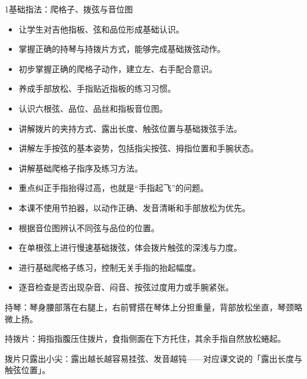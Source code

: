 \begin{lessoncard}{1}{基础指法：爬格子、拨弦与音位图}
\begin{itemize}
\item 让学生对吉他指板、弦和品位形成基础认识。
\item 掌握正确的持琴与持拨片方式，能够完成基础拨弦动作。
\item 初步掌握正确的爬格子动作，建立左、右手配合意识。
\item 养成手部放松、手指贴近指板的练习习惯。
\end{itemize}
\begin{itemize}
\item 认识六根弦、品位、品丝和指板音位图。
\item 讲解拨片的夹持方式、露出长度、触弦位置与基础拨弦手法。
\item 讲解左手按弦的基本姿势，包括指尖按弦、拇指位置和手腕状态。
\item 讲解基础爬格子指序及练习方法。
\item 重点纠正手指抬得过高，也就是“手指起飞”的问题。
\item 本课不使用节拍器，以动作正确、发音清晰和手部放松为优先。
\end{itemize}
\begin{itemize}
\item 根据音位图辨认不同弦与品位的位置。
\item 在单根弦上进行慢速基础拨弦，体会拨片触弦的深浅与力度。
\item 进行基础爬格子练习，控制无关手指的抬起幅度。
\item 逐音检查是否出现杂音、闷音、按弦过度用力或手腕紧张。
\end{itemize}
\begin{fignote}
\begin{center}
\hspace{9mm}
\end{center}
\begin{fignotes}
\item 持琴：琴身腰部落在右腿上，右前臂搭在琴体上分担重量，背部放松坐直，琴颈略微上扬。
\item 持拨片：拇指指腹压住拨片，食指侧面在下方托住，其余手指自然放松蜷起。
\item 拨片只露出小尖：露出越长越容易挂弦、发音越钝——对应课文说的「露出长度与触弦位置」。

\end{fignotes}
\end{fignote}
\end{lessoncard}
